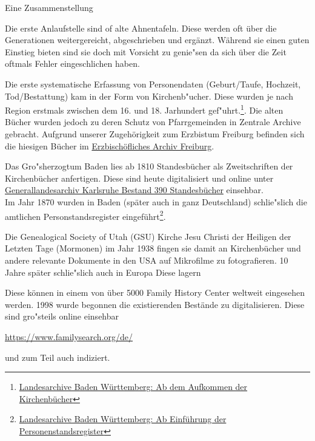 Eine Zusammenstellung



Die erste Anlaufstelle sind of alte Ahnentafeln. Diese werden oft über die Generationen weitergereicht, abgeschrieben und ergänzt. Während sie einen guten Einstieg bieten sind sie doch mit Vorsicht zu genie"sen da sich über die Zeit oftmals Fehler eingeschlichen haben.


Die erste systematische Erfassung von Personendaten (Geburt/Taufe, Hochzeit, Tod/Bestattung) kam in der Form von Kirchenb"ucher. Diese wurden je nach Region erstmals zwischen dem 16. und 18. Jarhundert gef"uhrt.\footnote{\href{https://www.landesarchiv-bw.de/web/57490}{Landesarchive Baden Württemberg: Ab dem Aufkommen der Kirchenbücher}}. Die alten Bücher wurden jedoch zu deren Schutz von Pfarrgemeinden in Zentrale Archive gebracht. Aufgrund unserer Zugehörigkeit zum Erzbistum Freiburg befinden sich die hiesigen Bücher im \href{http://www.katholische-archive.de/Di\%C3\%B6zesanarchive/Freiburg/tabid/78/Default.aspx}{Erzbischöfliches Archiv Freiburg}.


Das Gro"sherzogtum Baden lies ab 1810 Standesbücher als Zweitschriften der Kirchenbücher anfertigen. Diese sind heute digitalisiert und online unter \href{https://www2.landesarchiv-bw.de/ofs21/olf/startbild.php?bestand=12390}{Generallandesarchiv Karlsruhe Bestand 390 Standesbücher} einsehbar.\\

Im Jahr 1870 wurden in Baden (später auch in ganz Deutschland) schlie"slich die amtlichen Personstandsregister eingeführt\footnote{\href{https://www.landesarchiv-bw.de/web/57479}{Landesarchive Baden Württemberg: Ab Einführung der Personenstandsregister}}. 



Die Genealogical Society of Utah (GSU)
Kirche Jesu Christi der Heiligen der Letzten Tage (Mormonen)
im Jahr 1938 fingen sie damit an Kirchenbücher und andere relevante Dokumente in den USA auf Mikrofilme zu fotografieren. 10 Jahre später schlie"slich auch in Europa Diese lagern 

Diese können in einem von über 5000 Family History Center weltweit eingesehen werden. 1998 wurde begonnen die existierenden Bestände zu digitalisieren. Diese sind gro"steils online einsehbar 
\begin{center}
    \url{https://www.familysearch.org/de/}
\end{center}
und zum Teil auch indiziert.

